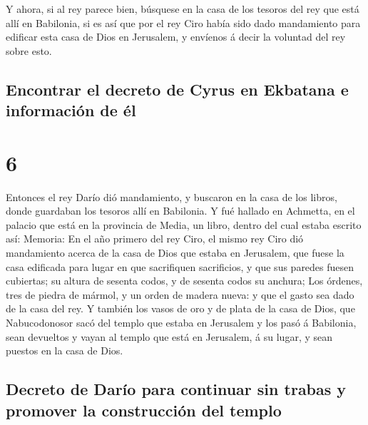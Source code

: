  Y ahora, si al rey parece bien, búsquese en la casa de
los tesoros del rey que está allí en Babilonia, si es así que por el rey
Ciro había sido dado mandamiento para edificar esta casa de Dios en
Jerusalem, y envíenos á decir la voluntad del rey sobre esto.

\hypertarget{encontrar-el-decreto-de-cyrus-en-ekbatana-e-informaciuxf3n-de-uxe9l}{%
\subsection{Encontrar el decreto de Cyrus en Ekbatana e información de
él}\label{encontrar-el-decreto-de-cyrus-en-ekbatana-e-informaciuxf3n-de-uxe9l}}

\hypertarget{section-5}{%
\section{6}\label{section-5}}

 Entonces el rey Darío dió mandamiento, y buscaron en la
casa de los libros, donde guardaban los tesoros allí en Babilonia.
 Y fué hallado en Achmetta, en el palacio que está en la
provincia de Media, un libro, dentro del cual estaba escrito así:
Memoria:  En el año primero del rey Ciro, el mismo rey
Ciro dió mandamiento acerca de la casa de Dios que estaba en Jerusalem,
que fuese la casa edificada para lugar en que sacrifiquen sacrificios, y
que sus paredes fuesen cubiertas; su altura de sesenta codos, y de
sesenta codos su anchura;  Los órdenes, tres de piedra de
mármol, y un orden de madera nueva: y que el gasto sea dado de la casa
del rey.  Y también los vasos de oro y de plata de la casa
de Dios, que Nabucodonosor sacó del templo que estaba en Jerusalem y los
pasó á Babilonia, sean devueltos y vayan al templo que está en
Jerusalem, á su lugar, y sean puestos en la casa de Dios.

\hypertarget{decreto-de-daruxedo-para-continuar-sin-trabas-y-promover-la-construcciuxf3n-del-templo}{%
\subsection{Decreto de Darío para continuar sin trabas y promover la
construcción del
templo}\label{decreto-de-daruxedo-para-continuar-sin-trabas-y-promover-la-construcciuxf3n-del-templo}}

